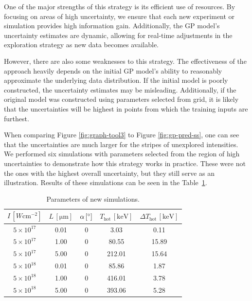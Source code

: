 One of the major strengths of this strategy is its efficient use of resources. By focusing on areas of high uncertainty, we ensure that each new experiment or simulation provides high information gain. Additionally, the GP model's uncertainty estimates are dynamic, allowing for real-time adjustments in the exploration strategy as new data becomes available. 

However, there are also some weaknesses to this strategy. The effectiveness of the approach heavily depends on the initial GP model's ability to reasonably approximate the underlying data distribution. If the initial model is poorly constructed, the uncertainty estimates may be misleading. Additionally, if the original model was constructed using parameters selected from grid, it is likely that the uncertainties will be highest in points from which the training inputs are furthest.

When comparing Figure \ref{fig:graph-tool3} to Figure \ref{fig:gp-pred-ss}, one can see that the uncertainties are much larger for the stripes of unexplored intensities. We performed six simulations with parameters selected from the region of high uncertainties to demonstrate how this strategy works in practice. These were not the ones with the highest overall uncertainty, but they still serve as an illustration. Results of these simulations can be seen in the Table~\ref{tab:new-simulations}.

\begin{table}[h]
	\centering
	\caption{Parameters of new simulations.}
	\begin{tabular}{c c c c c}
		\toprule
	     $I \, \left[W \mathrm{cm}^{-2}\right]$ & $L \, \mathrm{[\mu m]}$ & $\alpha \, \mathrm{[\degree]}$  & $T_\mathrm{hot} \, [\mathrm{keV}] $ &  $\Delta T_\mathrm{hot} \, [\mathrm{keV}]$ \\ 
		\midrule
		$5\times 10^{17}$ & 0.01 &0 &3.03 &0.11  \\
		$5\times 10^{17}$ & 1.00 &0 &80.55 & 15.89 \\
		$5\times 10^{17}$ & 5.00 &0 &212.01 & 15.64 \\
		$5\times 10^{18}$ & 0.01 &0 &85.86 & 1.87 \\
		$5\times 10^{18}$ & 1.00 &0 &416.01 & 3.78 \\
		$5\times 10^{18}$ & 5.00 &0 &393.06 & 5.28 \\
		\bottomrule
	\end{tabular}
	\label{tab:new-simulations}
\end{table}

